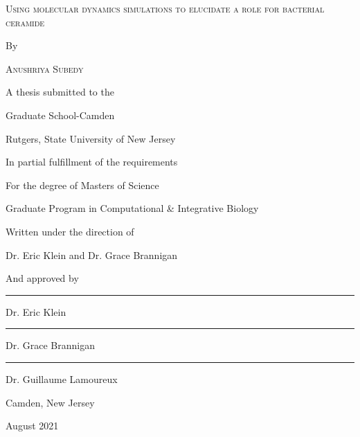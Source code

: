 \documentclass[10pt, letterpaper]{article}
\begin{document}
\renewcommand{\thepage}{\roman{page}}
\begin{titlepage}
	\centering
	{\scshape\large Using molecular dynamics simulations to elucidate a role for bacterial ceramide \par}
	 By \par
	{\scshape\large Anushriya Subedy \par}
	 A thesis submitted to the \par
	 Graduate School-Camden \par
	 Rutgers, State University of New Jersey \par

	 In partial fulfillment of the requirements\par

	 For the degree of Masters of Science\par

	 Graduate Program in Computational \& Integrative Biology\par

	 Written under the direction of\par

	 Dr. Eric Klein and Dr. Grace Brannigan \par

	 And approved by\par
	
	\noindent\rule{8cm}{0.4pt}\par
	Dr. Eric Klein\par
	
	\noindent\rule{8cm}{0.4pt}\par
	Dr. Grace Brannigan \par
	
	\noindent\rule{8cm}{0.4pt}\par
	Dr. Guillaume Lamoureux \par
	
	

	\vfill
	Camden, New Jersey\par
	August 2021\par
\end{titlepage}

\newpage
\end{document}
